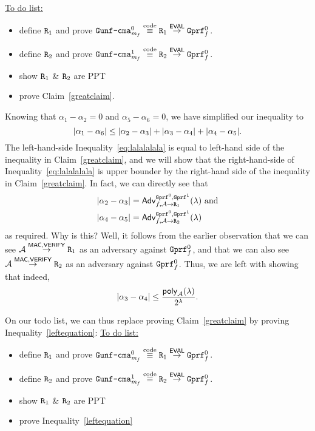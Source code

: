 \documentclass[a4paper,table,dvipsnames]{article}
\theoremstyle{definition}
\newcommand{\M}[1]{\ensuremath{\text{\texttt{#1}}}}
\renewcommand{\O}[1]{\ensuremath{\mathsf{#1}}}
\newcommand{\pcvar}[1]{\ensuremath{\mathit{#1}}}
\newcommand{\m}{\pcvar{m}} %
\begin{document}
	\underline{\underline{To do list:}}
	\begin{itemize}
	\item define $\M{R}_1$ and prove $\M{Gunf\text{-}cma}_{\m_f}^0\stackrel{\text{code}}{\equiv}\M{R}_1\stackrel{\O{EVAL}}{\rightarrow}\M{Gprf}^0_f$.
	\item define $\M{R}_2$ and prove $\M{Gunf\text{-}cma}_{\m_f}^1\stackrel{\text{code}}{\equiv}\M{R}_2\stackrel{\O{EVAL}}{\rightarrow}\M{Gprf}^0_f$.
  \item show $\M{R}_1$ \& $\M{R}_2$ are PPT
	\item prove Claim~\ref{greatclaim}.
	\end{itemize}
Knowing that $\alpha_1-\alpha_2=0$ and $\alpha_5-\alpha_6=0$, we have simplified our inequality to
\begin{equation}\label{eq:lalalalala}
\abs{\alpha_1-\alpha_6}\leq\abs{\alpha_2-\alpha_3}+\abs{\alpha_3-\alpha_4}+\abs{\alpha_4-\alpha_5}.
\end{equation}
The left-hand-side Inequality~\ref{eq:lalalalala} is equal to left-hand side of the inequality in Claim~\ref{greatclaim},
and we will show that the right-hand-side of Inequality~\ref{eq:lalalalala} is upper bounder by the right-hand side of the
inequality in Claim~\ref{greatclaim}. In fact, we can directly see that
\begin{align*}
\abs{\alpha_2-\alpha_3}&=\mathsf{Adv}^{\M{Gprf}^0,\M{Gprf}^1}_{f,\adv\rightarrow\M{R}_1}(\lambda) \text{ and}\\
\abs{\alpha_4-\alpha_5}&=\mathsf{Adv}^{\M{Gprf}^0,\M{Gprf}^1}_{f,\adv\rightarrow\M{R}_2}(\lambda)
\end{align*}
as required. Why is this? Well, it follows from the earlier observation that we can see $\adv\stackrel{\O{MAC},\O{VERIFY}}{\rightarrow}\M{R}_1$ as an adversary against $\M{Gprf}^0_f$, and that we can also see $\adv\stackrel{\O{MAC},\O{VERIFY}}{\rightarrow}\M{R}_2$ as an adversary against $\M{Gprf}^0_f$. Thus, we are left with showing that indeed,
\begin{equation}\label{leftequation}
\abs{\alpha_3-\alpha_4}\leq\frac{\O{poly}_{\adv}(\lambda)}{2^\lambda}.
\end{equation}

\clearpage
On our todo list, we can thus replace proving Claim~\ref{greatclaim} by proving Inequality~\ref{leftequation}:
\medskip
	\underline{\underline{To do list:}}
	\begin{itemize}
	\item define $\M{R}_1$ and prove $\M{Gunf\text{-}cma}_{\m_f}^0\stackrel{\text{code}}{\equiv}\M{R}_1\stackrel{\O{EVAL}}{\rightarrow}\M{Gprf}^0_f$.
	\item define $\M{R}_2$ and prove $\M{Gunf\text{-}cma}_{\m_f}^1\stackrel{\text{code}}{\equiv}\M{R}_2\stackrel{\O{EVAL}}{\rightarrow}\M{Gprf}^0_f$.
  \item show $\M{R}_1$ \& $\M{R}_2$ are PPT
	\item prove Inequality~\ref{leftequation}
	\end{itemize}
\end{document}
